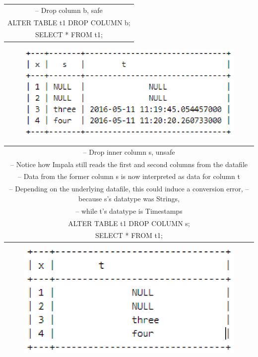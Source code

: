 \documentclass[onecolumn, draftclsnofoot,10pt, compsoc]{IEEEtran}
\begin{document}
\begin{center}
    \begin{tabular}{|c|}
    \hline
-- Drop column b, safe\\
ALTER TABLE t1 DROP COLUMN b;\\
SELECT * FROM t1;\\
    \hline
    \end{tabular}
\end{center}
\begin{figure}[ht]
    \centering
    \includegraphics[keepaspectratio]{ili2.eps}
\end{figure}
\begin{center}
    \begin{tabular}{|c|}
    \hline
-- Drop inner column s, unsafe \\
-- Notice how Impala still reads the first and second columns from the datafile \\
-- Data from the former column s is now interpreted as data for column t \\
-- Depending on the underlying datafile, this could induce a conversion error,
-- because s’s datatype was Strings, \\
-- while t’s datatype is Timestamps \\
ALTER TABLE t1 DROP COLUMN s;\\
SELECT * FROM t1;\\
    \hline
    \end{tabular}
\end{center}

\begin{figure}[ht]
    \centering
    \includegraphics[keepaspectratio]{ili3.eps}
\end{figure}
\end{document}
